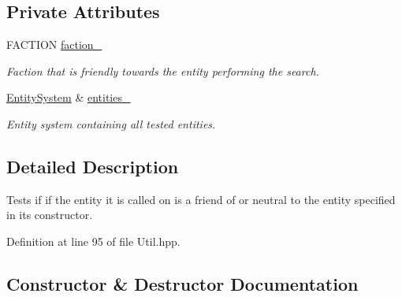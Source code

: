 \subsection*{Private Attributes}
\begin{DoxyCompactItemize}
\item 
F\+A\+C\+T\+I\+ON \hyperlink{structutil_1_1_i_s___f_r_i_e_n_d_l_y___o_r___n_e_u_t_r_a_l_a99cf55fbf81903d19113710b0388a725}{faction\+\_\+}
\begin{DoxyCompactList}\small\item\em Faction that is friendly towards the entity performing the search. \end{DoxyCompactList}\item 
\hyperlink{class_entity_system}{Entity\+System} \& \hyperlink{structutil_1_1_i_s___f_r_i_e_n_d_l_y___o_r___n_e_u_t_r_a_l_afb4fe556d2a7718a16265977cdac5ea1}{entities\+\_\+}
\begin{DoxyCompactList}\small\item\em Entity system containing all tested entities. \end{DoxyCompactList}\end{DoxyCompactItemize}


\subsection{Detailed Description}
Tests if if the entity it is called on is a friend of or neutral to the entity specified in it\textquotesingle{}s constructor. 

Definition at line 95 of file Util.\+hpp.



\subsection{Constructor \& Destructor Documentation}
